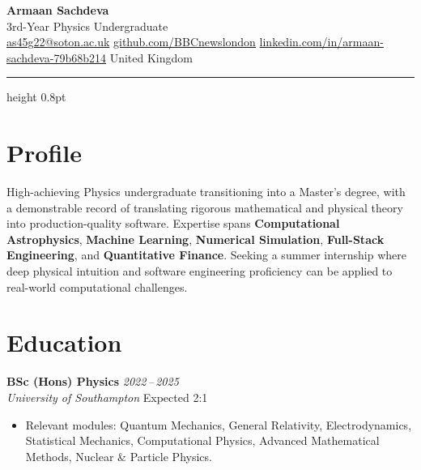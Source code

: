 \documentclass[10pt, a4paper]{article}
\newcommand{\cvname}[1]{%
  {\Huge\bfseries\color{accent} #1}%
}
\newcommand{\cvtitle}[1]{%
  {\large\color{light} #1}%
}
\begin{document}
\pagestyle{plain}

\begin{center}
  \cvname{Armaan Sachdeva}\\[4pt]
  \cvtitle{3rd-Year Physics Undergraduate}\\[6pt]
  \small
  \faEnvelope\;\href{mailto:as45g22@soton.ac.uk}{as45g22@soton.ac.uk}\quad
  \faGithub\;\href{https://github.com/BBCnewslondon}{github.com/BBCnewslondon}\quad
  \faLinkedin\;\href{https://www.linkedin.com/in/armaan-sachdeva-79b68b214/}{linkedin.com/in/armaan-sachdeva-79b68b214}\quad
  \faMapMarker*\;United Kingdom
\end{center}

\vspace{2pt}
{\color{rule}\hrule height 0.8pt}
\vspace{6pt}

\section{Profile}

High-achieving Physics undergraduate transitioning into a Master's degree, with a demonstrable record of
translating rigorous mathematical and physical theory into production-quality software.
Expertise spans \textbf{Computational Astrophysics}, \textbf{Machine Learning}, \textbf{Numerical Simulation},
\textbf{Full-Stack Engineering}, and \textbf{Quantitative Finance}.
Seeking a summer internship where deep physical intuition and software engineering proficiency can be applied
to real-world computational challenges.

\section{Education}

\textbf{BSc (Hons) Physics} \hfill \textit{2022\,--\,2025}\\
\textit{University of Southampton} \hfill \textcolor{light}{Expected 2:1}

\begin{itemize}
  \item Relevant modules: Quantum Mechanics, General Relativity, Electrodynamics, Statistical Mechanics,
        Computational Physics, Advanced Mathematical Methods, Nuclear \& Particle Physics.
\end{itemize}
\end{document}
